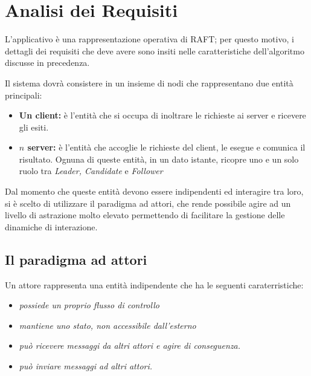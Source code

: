 \section{Analisi dei Requisiti} \label{Actors}
L'applicativo è una rappresentazione operativa di RAFT; per questo motivo, i dettagli dei requisiti che deve avere sono insiti nelle caratteristiche dell'algoritmo discusse in precedenza. 

Il sistema dovrà consistere in un insieme di nodi che rappresentano due entità principali:
	\begin{itemize}
		\item \textbf{Un client:} è l'entità che si occupa di inoltrare le richieste ai server e ricevere gli esiti.
		\item \textbf{$n$ server:} è l'entità che accoglie le richieste del client, le esegue e comunica il risultato. Ognuna di queste entità, in un dato istante, ricopre uno e un solo ruolo tra \textit{Leader, Candidate} e \textit{Follower}
	\end{itemize}

Dal momento che queste entità devono essere indipendenti ed interagire tra loro, si è scelto di utilizzare il paradigma ad attori, che rende possibile agire ad un livello di astrazione molto elevato permettendo di facilitare la gestione delle dinamiche di interazione.


	\subsection{Il paradigma ad attori} \label{Actors}
	Un attore rappresenta una entità indipendente che ha le seguenti caraterristiche:
	\begin{itemize}
		\item \emph{possiede un proprio flusso di controllo}
		\item \emph{mantiene uno stato, non accessibile dall'esterno}
		\item \emph{può ricevere messaggi da altri attori e agire di conseguenza.}
		\item \emph{può inviare messaggi ad altri attori.}
	\end{itemize}
